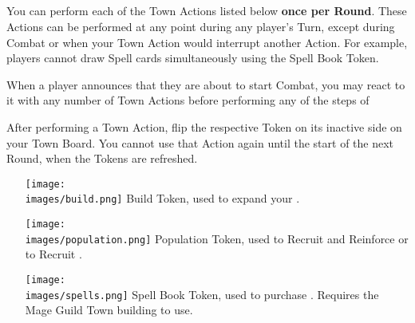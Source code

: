 \begin{multicols}{2}
\subsection*{}
You can perform each of the Town Actions listed below \textbf{once per Round}.
These Actions can be performed at any point during any player's Turn, except during Combat or when your Town Action would interrupt another Action.
For example, players cannot draw Spell cards simultaneously using the Spell Book Token.\par
When a player announces that they are about to start Combat, you may react to it with any number of Town Actions before performing any of the steps of \par
After performing a Town Action, flip the respective Token on its inactive side on your Town Board.
You cannot use that Action again until the start of the next Round, when the Tokens are refreshed.
\begin{itemize}
  \item [{\texttt{[image: \\images/build.png]}}] Build Token, used to expand your .
  \item [{\texttt{[image: \\images/population.png]}}] Population Token, used to Recruit and Reinforce  or to Recruit .
  \item [{\texttt{[image: \\images/spells.png]}}]Spell Book Token, used to purchase . Requires the Mage Guild Town building to use.
\end{itemize}


\end{multicols}
